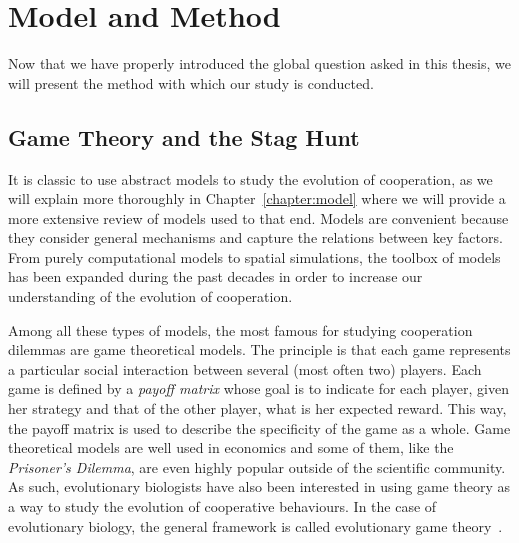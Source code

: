 



\section{Model and Method}

  Now that we have properly introduced the global question asked in this thesis, we will present the method with which our study is conducted.
  
  \subsection{Game Theory and the Stag Hunt}

    It is classic to use abstract models to study the evolution of cooperation, as we will explain more thoroughly in Chapter~\ref{chapter:model} where we will provide a more extensive review of models used to that end. Models are convenient because they consider general mechanisms and capture the relations between key factors. From purely computational models to spatial simulations, the toolbox of models has been expanded during the past decades in order to increase our understanding of the evolution of cooperation.

    Among all these types of models, the most famous for studying cooperation dilemmas are game theoretical models. The principle is that each game represents a particular social interaction between several (most often two) players. Each game is defined by a \emph{payoff matrix} whose goal is to indicate for each player, given her strategy and that of the other player, what is her expected reward. This way, the payoff matrix is used to describe the specificity of the game as a whole. Game theoretical models are well used in economics and some of them, like the \emph{Prisoner's Dilemma}, are even highly popular outside of the scientific community. As such, evolutionary biologists have also been interested in using game theory as a way to study the evolution of cooperative behaviours. In the case of evolutionary biology, the general framework is called evolutionary game theory~\parencite{MaynardSmith1973}.


